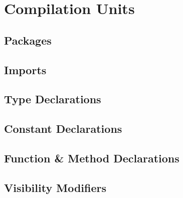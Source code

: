 \chapter{Compilation Units}
\section{Packages}
\section{Imports}
\section{Type Declarations}
\section{Constant Declarations}
\section{Function \& Method Declarations}
\section{Visibility Modifiers}




